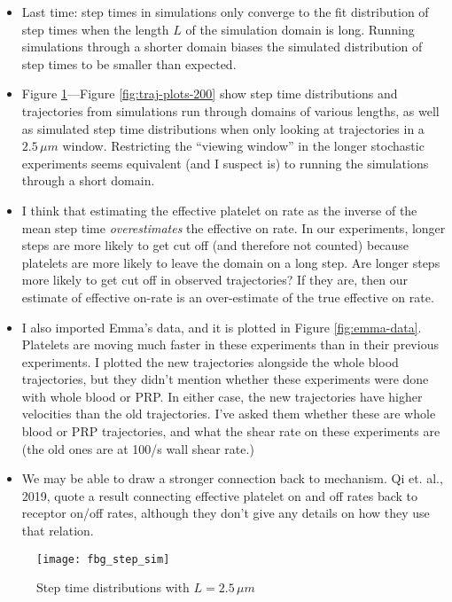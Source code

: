 \documentclass{article}
\begin{document}
\begin{itemize}
\item Last time: step times in simulations only converge to the
  fit distribution of step times when the length $L$ of the simulation
  domain is long. Running simulations through a shorter domain biases
  the simulated distribution of step times to be smaller than expected.
\item Figure \ref{fig:step-time}---Figure \ref{fig:traj-plots-200} show step
  time distributions and trajectories from simulations run through
  domains of various lengths, as well as simulated step time
  distributions when only looking at trajectories in a $2.5 \, \mu m$
  window. Restricting the ``viewing window'' in the longer
  stochastic experiments seems equivalent (and I suspect is) to
  running the simulations through a short domain.
\item I think that estimating the effective platelet on rate as the
  inverse of the mean step time \emph{overestimates} the effective on
  rate. In our experiments, longer steps are more likely to get cut
  off (and therefore not counted) because platelets are more likely to
  leave the domain on a long step. Are longer steps more likely to get
  cut off in observed trajectories? If they are, then our estimate of
  effective on-rate is an over-estimate of the true effective on rate.
\item I also imported Emma's data, and it is plotted in Figure
  \ref{fig:emma-data}. Platelets are moving much faster in these
  experiments than in their previous experiments. I plotted the new
  trajectories alongside the whole blood trajectories, but they didn't
  mention whether these experiments were done with whole blood or
  PRP. In either case, the new trajectories have higher velocities
  than the old trajectories. I've asked them whether these are whole
  blood or PRP trajectories, and what the shear rate on these
  experiments are (the old ones are at 100/s wall shear rate.)
\item We may be able to draw a stronger connection back to
  mechanism. Qi et. al., 2019, quote a result connecting effective
  platelet on and off rates back to receptor on/off rates, although
  they don't give any details on how they use that relation.
\end{itemize}

\begin{figure}
  \centering
  \texttt{[image: fbg\_step\_sim]}
  \caption{Step time distributions with $L = 2.5 \, \mu m$}
  \label{fig:step-time}
\end{figure}
\end{document}
